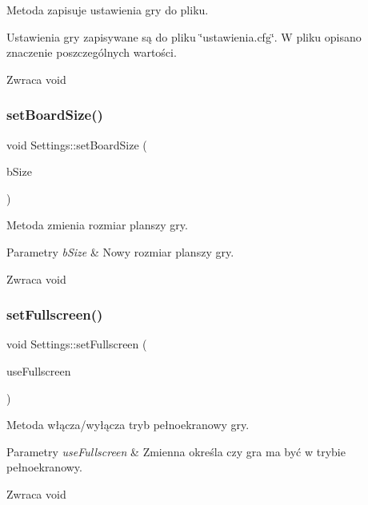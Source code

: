 Metoda zapisuje ustawienia gry do pliku. 

Ustawienia gry zapisywane są do pliku \char`\"{}ustawienia.\+cfg\char`\"{}. W pliku opisano znaczenie poszczególnych wartości.

\begin{DoxyReturn}{Zwraca}
void 
\end{DoxyReturn}
\mbox{\label{class_settings_ababab6bbb76eb78b7894eebe2383b51a}} 
\subsubsection{setBoardSize()}
{\footnotesize\ttfamily void Settings\+::set\+Board\+Size (\begin{DoxyParamCaption}\item[{Board\+Size}]{b\+Size }\end{DoxyParamCaption})}



Metoda zmienia rozmiar planszy gry. 


\begin{DoxyParams}{Parametry}
{\em b\+Size} & Nowy rozmiar planszy gry. \\
\hline
\end{DoxyParams}
\begin{DoxyReturn}{Zwraca}
void 
\end{DoxyReturn}
\mbox{\label{class_settings_ad36ea0955122e6d5126bd341af4a035d}} 
\subsubsection{setFullscreen()}
{\footnotesize\ttfamily void Settings\+::set\+Fullscreen (\begin{DoxyParamCaption}\item[{bool}]{use\+Fullscreen }\end{DoxyParamCaption})}



Metoda włącza/wyłącza tryb pełnoekranowy gry. 


\begin{DoxyParams}{Parametry}
{\em use\+Fullscreen} & Zmienna określa czy gra ma być w trybie pełnoekranowy. \\
\hline
\end{DoxyParams}
\begin{DoxyReturn}{Zwraca}
void 
\end{DoxyReturn}
\mbox{\label{class_settings_a66895fcaf25d64d0e6f09c77e7614879}} 
